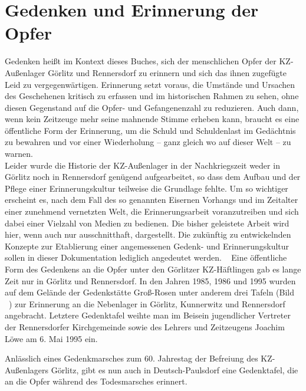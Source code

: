 \chapter{Gedenken und Erinnerung der Opfer}

Gedenken heißt im Kontext dieses Buches, sich der menschlichen Opfer der KZ-Außenlager Görlitz und Rennersdorf zu erinnern und sich das ihnen zugefügte Leid zu vergegenwärtigen. 
Erinnerung setzt voraus, die Umstände und Ursachen des Geschehenen kritisch zu erfassen und im historischen Rahmen zu sehen, ohne diesen Gegenstand auf die Opfer- und Gefangenenzahl zu reduzieren. Auch dann, wenn kein Zeitzeuge mehr seine mahnende Stimme erheben kann, braucht es eine öffentliche Form der Erinnerung, um die Schuld und Schuldenlast im Gedächtnis zu bewahren und vor einer Wiederholung -- ganz gleich wo auf dieser Welt -- zu warnen. 
\\
Leider wurde die Historie der KZ-Außenlager in der Nachkriegszeit weder in Görlitz noch in Rennersdorf genügend aufgearbeitet, so dass dem Aufbau und der Pflege einer Erinnerungskultur teilweise die Grundlage fehlte. Um so wichtiger erscheint es, nach dem Fall des so genannten Eisernen Vorhangs und im Zeitalter einer zunehmend vernetzten Welt, die Erinnerungsarbeit voranzutreiben und sich dabei einer Vielzahl von Medien zu bedienen. Die bisher geleistete Arbeit wird hier, wenn auch nur ausschnitthaft, dargestellt. Die zukünftig zu entwickelnden Konzepte zur Etablierung einer angemessenen Gedenk- und Erinnerungskultur sollen in dieser Dokumentation lediglich angedeutet werden.
~\newline
Eine öffentliche Form des Gedenkens an die Opfer unter den Görlitzer KZ-Häftlingen gab es lange Zeit nur in Görlitz und Rennersdorf. 
In den Jahren 1985, 1986 und 1995 wurden auf dem Gelände der Gedenkstätte Groß-Rosen unter anderem drei Tafeln (Bild ~) zur Erinnerung an die Nebenlager in Görlitz, Kunnerwitz und Rennersdorf angebracht. Letztere Gedenktafel weihte man im Beisein jugendlicher Vertreter der Rennersdorfer Kirchgemeinde sowie des Lehrers und Zeitzeugens Joachim Löwe am 6. Mai 1995 ein.\newline

Anlässlich eines Gedenkmarsches zum 60. Jahrestag der Befreiung des KZ-Außenlagers Görlitz, gibt es nun auch in Deutsch-Paulsdorf eine Gedenktafel, die an die Opfer während des Todesmarsches erinnert.\newline

